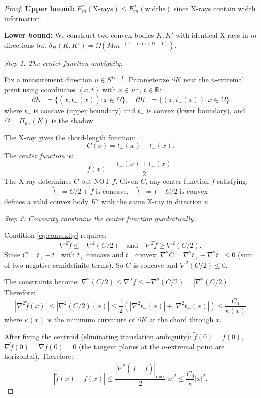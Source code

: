 \begin{proof}
\textbf{Upper bound:} $E_m^*(\text{X-rays}) \leq E_m^*(\text{widths})$ since X-rays contain width information.

\textbf{Lower bound:} We construct two convex bodies $K, K'$ with identical X-rays in $m$ directions but $\delta_H(K, K') = \Omega(M m^{-(1+\alpha)/(D-1)})$.

\emph{Step 1: The center-function ambiguity.}

Fix a measurement direction $u \in S^{D-1}$. Parameterize $\partial K$ near the $u$-extremal point using coordinates $(x, t)$ with $x \in u^\perp$, $t \in \mathbb{R}$:
\[
  \partial K^+ = \{(x, t_+(x)) : x \in \Omega\}, \quad \partial K^- = \{(x, t_-(x)) : x \in \Omega\}
\]
where $t_+$ is concave (upper boundary) and $t_-$ is convex (lower boundary), and $\Omega = \Pi_{u^\perp}(K)$ is the shadow.

The X-ray gives the chord-length function:
\[
  C(x) = t_+(x) - t_-(x).
\]
The \emph{center function} is:
\[
  f(x) = \frac{t_+(x) + t_-(x)}{2}.
\]
The X-ray determines $C$ but NOT $f$. Given $C$, any center function $\tilde{f}$ satisfying:
\begin{equation}\label{eq:convexity}
  \tilde{t}_+ = C/2 + \tilde{f} \text{ is concave}, \quad \tilde{t}_- = \tilde{f} - C/2 \text{ is convex}
\end{equation}
defines a valid convex body $K'$ with the same X-ray in direction $u$.

\emph{Step 2: Convexity constrains the center function quadratically.}

Condition \eqref{eq:convexity} requires:
\[
  \nabla^2 \tilde{f} \leq -\nabla^2(C/2) \quad \text{and} \quad \nabla^2 \tilde{f} \geq \nabla^2(C/2).
\]
Since $C = t_+ - t_-$ with $t_+$ concave and $t_-$ convex: $\nabla^2 C = \nabla^2 t_+ - \nabla^2 t_- \leq 0$ (sum of two negative-semidefinite terms). So $C$ is concave and $\nabla^2(C/2) \leq 0$.

The constraints become: $\nabla^2(C/2) \leq \nabla^2 \tilde{f} \leq -\nabla^2(C/2) = |\nabla^2(C/2)|$. Therefore:
\[
  |\nabla^2 \tilde{f}(x)| \leq |\nabla^2(C/2)(x)| \leq \frac{1}{2}\left(|\nabla^2 t_+(x)| + |\nabla^2 t_-(x)|\right) \leq \frac{C_0}{\kappa(x)}
\]
where $\kappa(x)$ is the minimum curvature of $\partial K$ at the chord through $x$.

After fixing the centroid (eliminating translation ambiguity): $\tilde{f}(0) = f(0)$, $\nabla \tilde{f}(0) = \nabla f(0) = 0$ (the tangent planes at the $u$-extremal point are horizontal). Therefore:
\[
  |\tilde{f}(x) - f(x)| \leq \frac{|\nabla^2(\tilde{f} - f)|_{\max}}{2} |x|^2 \leq \frac{C_0}{\kappa} |x|^2.
\]


\end{proof}
